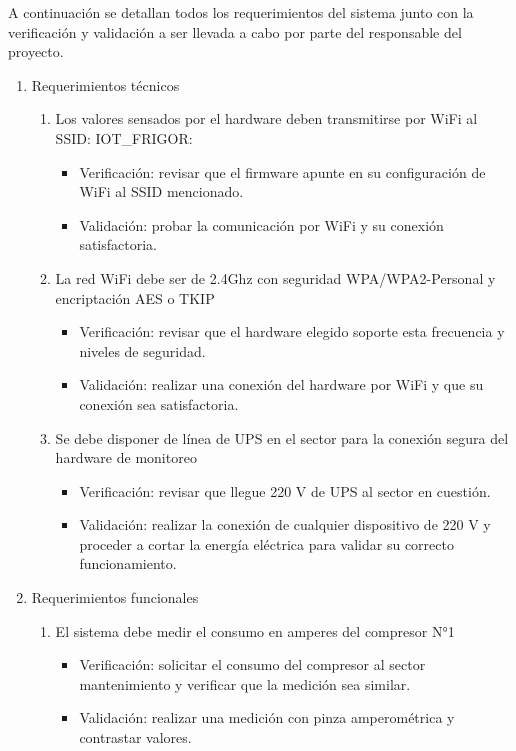\documentclass[
11pt, %
]{charter}
\begin{document}
A continuación se detallan todos los requerimientos del sistema junto con la verificación y validación a ser llevada a cabo por parte del responsable del proyecto.
\begin{enumerate}
	\item Requerimientos técnicos
		\begin{enumerate}
			\item Los valores sensados por el hardware deben transmitirse por WiFi al SSID: IOT\_FRIGOR:
			\begin{itemize}
				\item Verificación: revisar que el firmware apunte en su configuración de WiFi al SSID mencionado.
				\item Validación: probar la comunicación por WiFi y su conexión satisfactoria.
			\end{itemize}
			\item La red WiFi debe ser de 2.4Ghz con seguridad WPA/WPA2-Personal y encriptación AES o TKIP
			\begin{itemize}
				\item Verificación: revisar que el hardware elegido soporte esta frecuencia y niveles de seguridad.
				\item Validación: realizar una conexión del hardware por WiFi y que su conexión sea satisfactoria.
			\end{itemize}
			\item Se debe disponer de línea de UPS en el sector para la conexión segura del hardware de monitoreo
			\begin{itemize}
				\item Verificación: revisar que llegue 220 V de UPS al sector en cuestión.
				\item Validación: realizar la conexión de cualquier dispositivo de 220 V y proceder a cortar la energía eléctrica para validar su correcto funcionamiento.
			\end{itemize}
		\end{enumerate}
	\item Requerimientos funcionales
		\begin{enumerate}
			\item El sistema debe medir el consumo en amperes del compresor N°1
			\begin{itemize}
				\item Verificación: solicitar el consumo del compresor al sector mantenimiento y verificar que la medición sea similar.
				\item Validación: realizar una medición con pinza amperométrica y contrastar valores.

\end{itemize}
\end{enumerate}
\end{enumerate}
\end{document}
